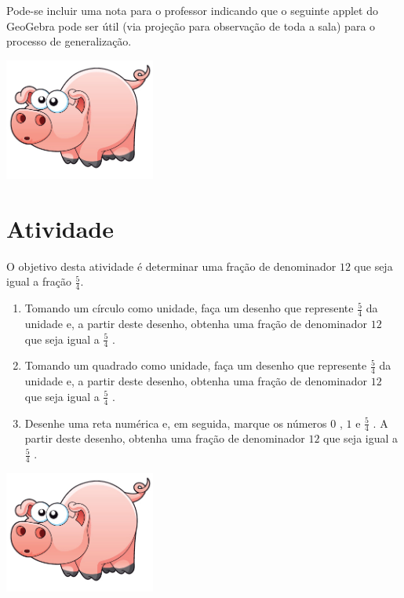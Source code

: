 \documentclass[a4,12pt]{book}
\newcounter{atividade}
\begin{document}
Pode-se incluir uma nota para o professor indicando que o seguinte applet do GeoGebra pode ser útil (via projeção para observação de toda a sala) para o processo de generalização.



\includegraphics[width=\textwidth,height=4cm, keepaspectratio]{pig}
\section{Atividade}








O objetivo desta atividade é determinar uma fração de denominador $12$ que seja igual a fração $\frac{5}{4}$.

\begin{enumerate} [\quad a)] %
  \item     Tomando um círculo como unidade, faça um desenho que represente     $\frac{5}{4}$     da unidade e, a partir deste desenho, obtenha uma fração de denominador     $12$     que seja igual a     $\frac{5}{4}$    . 
  \item     Tomando um quadrado como unidade, faça um desenho que represente     $\frac{5}{4}$     da unidade e, a partir deste desenho, obtenha uma fração de denominador     $12$     que seja igual a     $\frac{5}{4}$    . 
  \item     Desenhe uma reta numérica e, em seguida, marque os números     $0$    ,     $1$     e     $\frac{5}{4}$    . A partir deste desenho, obtenha uma fração de denominador     $12$     que seja igual a     $\frac{5}{4}$    . 
\end{enumerate} %









\includegraphics[width=\textwidth,height=4cm, keepaspectratio]{pig}
\end{document}
